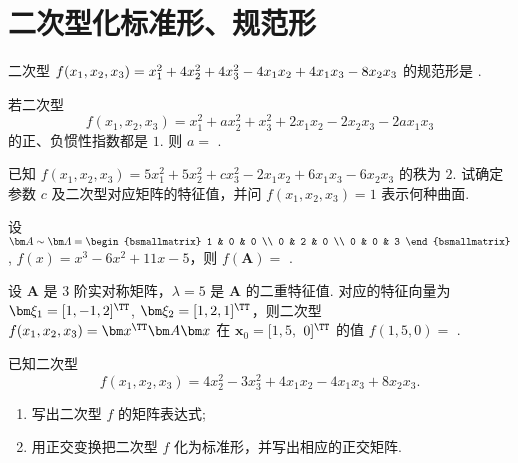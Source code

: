 \section{二次型化标准形、规范形}
	\begin{titwo}
		二次型 $f(x_{1},x_{2},x_{3}) = x_{1}^{2} + 4x_{2}^{2} + 4x_{3}^{2} - 4x_{1}x_{2} + 4\*x_{1}x_{3} - 8x_{2}x_{3}$ 的规范形是 \kuo.

	\end{titwo}

	\begin{titwo}
		若二次型
		\[
			f(x_{1},x_{2},x_{3}) = x_{1}^{2} + ax_{2}^{2} + x_{3}^{2} + 2x_{1}x_{2} - 2x_{2}x_{3} - 2ax_{1}x_{3}
		\]
		的正、负惯性指数都是 $1$. 则 $a = $ \htwo.
	\end{titwo}

	\begin{titwo}
		已知 $f(x_{1},x_{2},x_{3}) = 5x_{1}^{2} + 5x_{2}^{2} + cx_{3}^{2} - 2x_{1}x_{2} + 6x_{1}x_{3} - 6x_{2}x_{3}$ 的秩为 $2$. 试确定参数 $c$ 及二次型对应矩阵的特征值，并问 $f(x_{1},x_{2},x_{3}) = 1$ 表示何种曲面.
	\end{titwo}

	\begin{titwo}
		设 $\bm A \sim \bm \varLambda = \begin{bsmallmatrix}
			1 & 0 & 0 \\
			0 & 2 & 0 \\
			0 & 0 & 3
		\end{bsmallmatrix}$, $f(x) = x^{3} - 6x^{2} + 11x - 5$，则 $f(\bm A) = $ \htwo.
	\end{titwo}

	\begin{titwo}
		设 $\bm A$ 是 $3$ 阶实对称矩阵，$\lambda = 5$ 是 $\bm A$ 的二重特征值. 对应的特征向量为 $\bm \xi_{1} = [1,-1,2]^{\TT}$, $\bm \xi_{2} = [1,2,1]^{\TT}$，则二次型 $f(x_{1},x_{2},x_{3}) = \bm x^{\TT} \bm A \bm x$ 在 $\bm x_{0} = [1,5,$ $0]^{\TT}$ 的值 $f(1,5,0) = $ \htwo.
	\end{titwo}

	\begin{titwo}
		已知二次型
		\[
			f(x_{1},x_{2},x_{3}) = 4x_{2}^{2} - 3x_{3}^{2} + 4x_{1}x_{2} - 4x_{1}x_{3} + 8x_{2}x_{3}.
		\]
		\begin{enumerate}
			\item 写出二次型 $f$ 的矩阵表达式;
			\item 用正交变换把二次型 $f$ 化为标准形，并写出相应的正交矩阵.
		\end{enumerate}
	\end{titwo}

